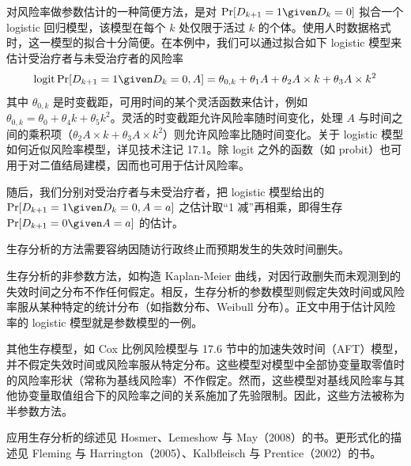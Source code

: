 对风险率做参数估计的一种简便方法，是对 $\Pr[D_{k+1}=1\given D_k=0]$ 拟合一个 logistic 回归模型，该模型在每个 $k$ 处仅限于活过 $k$ 的个体。使用人时数据格式时，这一模型的拟合十分简便。在本例中，我们可以通过拟合如下 logistic 模型来估计受治疗者与未受治疗者的风险率
\[
\operatorname{logit}\Pr[D_{k+1}=1\given D_k=0,A]=\theta_{0,k}+\theta_1A+\theta_2A\times k+\theta_3A\times k^2
\]
其中 $\theta_{0,k}$ 是时变截距，可用时间的某个灵活函数来估计，例如 $\theta_{0,k}=\theta_0+\theta_4k+\theta_5k^2$。灵活的时变截距允许风险率随时间变化，处理 $A$ 与时间之间的乘积项（$\theta_2A\times k+\theta_3A\times k^2$）则允许风险率比随时间变化。关于 logistic 模型如何近似风险率模型，详见技术注记 17.1。除 logit 之外的函数（如 probit）也可用于对二值结局建模，因而也可用于估计风险率。

随后，我们分别对受治疗者与未受治疗者，把 logistic 模型给出的 $\Pr[D_{k+1}=1\given D_k=0,A=a]$ 之估计取“1 减”再相乘，即得生存 $\Pr[D_{k+1}=0\given A=a]$ 的估计。

\begin{finepoint}[生存分析模型]
生存分析的方法需要容纳因随访行政终止而预期发生的失效时间删失。

生存分析的非参数方法，如构造 Kaplan-Meier 曲线，对因行政删失而未观测到的失效时间之分布不作任何假定。相反，生存分析的参数模型则假定失效时间或风险率服从某种特定的统计分布（如指数分布、Weibull 分布）。正文中用于估计风险率的 logistic 模型就是参数模型的一例。

其他生存模型，如 Cox 比例风险模型与 17.6 节中的加速失效时间（AFT）模型，并不假定失效时间或风险率服从特定分布。这些模型对模型中全部协变量取零值时的风险率形状（常称为基线风险率）不作假定。然而，这些模型对基线风险率与其他协变量取值组合下的风险率之间的关系施加了先验限制。因此，这些方法被称为半参数方法。

应用生存分析的综述见 Hosmer、Lemeshow 与 May（2008）的书。更形式化的描述见 Fleming 与 Harrington（2005）、Kalbfleisch 与 Prentice（2002）的书。
\end{finepoint}

\begin{figure}[htbp]
\centering
{}
\caption{}
\label{fig:17.4}
\end{figure}


